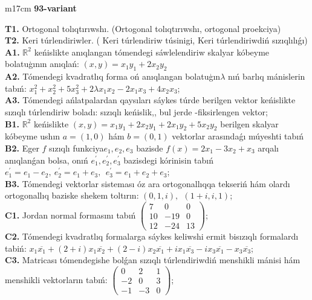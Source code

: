 \documentclass{article}
\begin{document}
\begin{tabular}{m{17cm}}
\textbf{93-variant}
\newline

\textbf{T1.} Ortogonal  tolıqtırıwshı. (Ortogonal tolıqtırıwshı,  ortogonal proekciya) \\
\textbf{T2.} Keri túrlendiriwler. ( Keri túrlendiriw túsinigi,   Keri túrlendiriwdiń sızıqlılıǵı) \\
\textbf{A1.} \(\mathbb{R}^{2}\) keńislikte anıqlangan tómendegi sáwlelendiriw skalyar kóbeyme bolatuģının anıqlań: \((x,y) = x_{1}y_{1} + 2x_{2}y_{2}\) \\
\textbf{A2.} Tómendegi kvadratlıq forma oń anıqlangan bolatuģın\(\lambda\) nıń barlıq mánislerin tabıń: \(x_{1}^{2} + x_{2}^{2} + 5x_{3}^{2} + 2\lambda x_{1}x_{2} - 2x_{1}x_{3} + 4x_{2}x_{3}\); \\
\textbf{A3.} Tómendegi ańlatpalardan qaysıları sáykes túrde berilgen vektor keńislikte sızıqlı túrlendiriw boladı: sızıqlı keńislik,, bul jerde -fiksirlengen vektor; \\
\textbf{B1.} \(\mathbb{R}^{2}\) keńislikte \((x,y) = x_{1}y_{1} + 2x_{2}y_{1} + 2x_{1}y_{2} + 5x_{2}y_{2}\) berilgen skalyar kóbeyme ushın \(a = (1,0)\) hám \(b = (0,1)\) vektorlar arasındaǵı múyeshti tabıń \\
\textbf{B2.} Eger \(f\) sızıqlı funkciya\(e_{1},e_{2},e_{3}\) bazisde \(f(x) = 2x_{1} - 3x_{2} + x_{3}\) arqalı anıqlanǵan bolsa, onıń \(e_{1}^{'},e_{2}^{'},e_{3}^{'}\) bazisdegi kórinisin tabıń\(e_{1}^{'} = e_{1} - e_{2},\ e_{2}^{'} = e_{1} + e_{3},\ \ e_{3}^{'} = e_{1} + e_{2} + e_{3}\); \\
\textbf{B3.} Tómendegi vektorlar sisteması óz ara ortogonallıqqa tekseriń hám olardı ortogonallıq baziske shekem toltırın: \((0,1,i),\ \ (1 + i,i,1)\); \\
\textbf{C1.} Jordan normal formasını tabıń \(\begin{pmatrix} 7 & 0 & 0 \\ 10 & - 19 & 0 \\ 12 & - 24 & 13 \end{pmatrix}\); \\
\textbf{C2.} Tómendegi kvadratlıq formalarga sáykes keliwshi ermit bisızıqlı formalardı tabiń: \(x_{1}\overline{x_{1}} + (2 + i)x_{1}\overline{x_{2}} + (2 - i)x_{2}\overline{x_{1}} + ix_{1}\overline{x_{3}} - ix_{3}\overline{x_{1}} - x_{3}\overline{x_{3}}\); \\
\textbf{C3.} Matricası tómendegishe bolǵan sızıqlı túrlendiriwdiń menshikli mánisi hám menshikli vektorların tabıń: \(\begin{pmatrix} 0 & 2 & 1 \\  - 2 & 0 & 3 \\  - 1 & - 3 & 0 \end{pmatrix}\); \\

\end{tabular}
\vspace{1cm}
\end{document}
